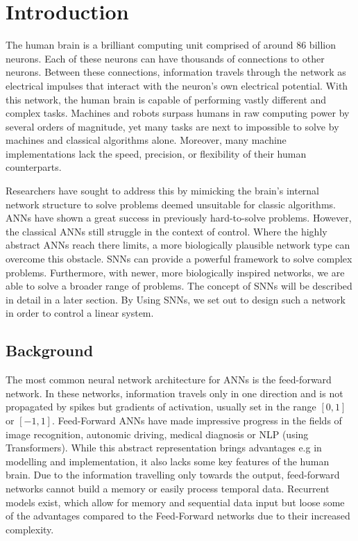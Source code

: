 \chapter{Introduction}

The human brain is a brilliant computing unit comprised of around 86 billion neurons\cite{azevedo_equal_2009}. Each of these neurons can have thousands of connections to other neurons. Between these connections, information travels through the network as electrical impulses that interact with the neuron's own electrical potential. With this network, the human brain is capable of performing vastly different and complex tasks. Machines and robots surpass humans in raw computing power by several orders of magnitude, yet many tasks are next to impossible to solve by machines and classical algorithms alone. Moreover, many machine implementations lack the speed, precision, or flexibility of their human counterparts.

Researchers have sought to address this by mimicking the brain's internal network structure to solve problems deemed unsuitable for classic algorithms. \acp{ANN} have shown a great success in previously hard-to-solve problems. However, the classical \acp{ANN} still struggle in the context of control. Where the highly abstract \acp{ANN} reach there limits, a more biologically plausible network type can overcome this obstacle. \acp{SNN} can provide a powerful framework to solve complex problems. Furthermore, with newer, more biologically inspired networks, we are able to solve a broader range of problems. The concept of \acp{SNN} will be described in detail in a later section. By Using \acp{SNN}, we set out to design such a network in order to control a linear system.

\section{Background}\label{sec:background}

The most common neural network architecture for \acp{ANN} is the feed-forward network.
In these networks, information travels only in one direction and is not propagated by spikes but gradients of activation, usually set in the range $[0,1]$ or $[-1,1]$.
Feed-Forward \acp{ANN} have made impressive progress in the fields of image recognition, autonomic driving, medical diagnosis\cite{patel_applications_2007} or  \ac{NLP} (using Transformers\cite{vaswani_attention_2017}). While this abstract representation brings advantages e.g in modelling and implementation, it also lacks some key features of the human brain. Due to the information travelling only towards the output, feed-forward networks cannot build a memory or easily process temporal data. Recurrent models exist, which allow for memory \cite{hutchison_biologically_2004} and sequential data input but loose some of the advantages compared to the Feed-Forward networks due to their increased complexity.\\

